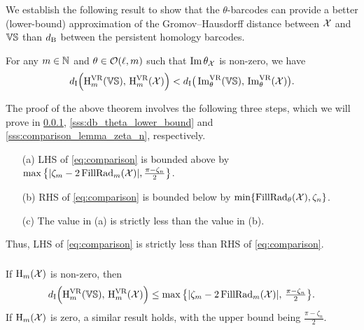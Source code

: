 We establish the following result to show that the $\theta$-barcodes can provide a better (lower-bound) approximation of the Gromov--Hausdorff distance between $\mathcal{X}$ and $\mathbb{V}\mathbb{S}$ than $d_{\mathrm{B}}$ between the persistent homology barcodes.

\medskip\theorem
For any $m \in \mathbb{N}$ and $\theta \in \mathcal{O}(\ell, m)$ such that $\operatorname{Im} \theta_{\mathcal{X}}$ is non-zero, we have
\begin{equation}\label{eq:comparison}
    d_{\mathrm{I}} \Big(\mathrm{H}^{\mathrm{VR}}_{m}(\mathbb{V}\mathbb{S}),\, \mathrm{H}^{\mathrm{VR}}_{m}(\mathcal{X})\Big) < d_{\mathrm{I}} \big(\operatorname{Im}^{\mathrm{VR}}_{\theta}(\mathbb{V}\mathbb{S}),\, \operatorname{Im}^{\mathrm{VR}}_{\theta}(\mathcal{X})\big) .
\end{equation}

The proof of the above theorem involves the following three steps, which we will prove in \cref{sss:db_upper_bound}, \cref{sss:db_theta_lower_bound} and \cref{sss:comparison_lemma_zeta_n}, respectively.
\begin{enumerate}
    \item [(a)] LHS of \cref{eq:comparison} is bounded above by $\max\big\{|\zeta_m  - 2\operatorname{FillRad}_{m}(\mathcal{X}) |, \tfrac{\pi - \zeta_n}{2}\big\}$.
    \item [(b)] RHS of \cref{eq:comparison} is bounded below by $\min\{\operatorname{FillRad}_{\theta}(\mathcal{X}), \zeta_n\}$.
    \item [(c)] The value in (a) is strictly less than the value in (b).
\end{enumerate}
Thus, LHS of \cref{eq:comparison} is strictly less than RHS of \cref{eq:comparison}.

\subsubsection{}\label{sss:db_upper_bound}

\medskip\lemma
If \( \operatorname{H}_m(\mathcal{X}) \) is non-zero, then
\begin{equation}\label{eq:db_usual_upper_bound}
    d_{\mathrm{I}}\Big(\mathrm{H}^{\mathrm{VR}}_{m}(\mathbb{V}\mathbb{S}),\, \mathrm{H}^{\mathrm{VR}}_{m}(\mathcal{X})\Big)
	\leq \max\big\{|\zeta_m  - 2\operatorname{FillRad}_{m}(\mathcal{X}) |,\, \tfrac{\pi - \zeta_n}{2}\big\}.
\end{equation}
If \( \operatorname{H}_m(\mathcal{X}) \) is zero, a similar result holds, with the upper bound being $\tfrac{\pi - \zeta_n}{2}$.

